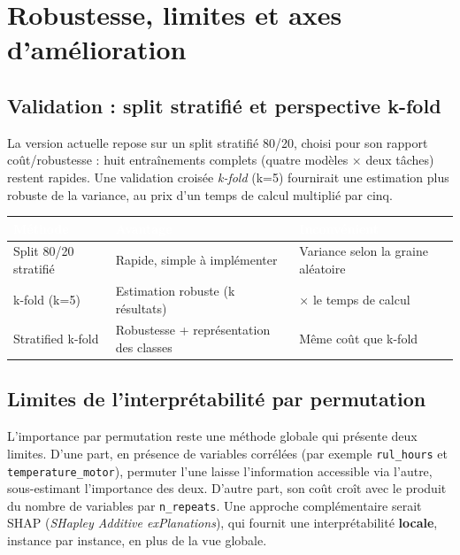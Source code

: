 \documentclass[11pt]{article}
\newcommand{\thead}[1]{\textbf{\textcolor{white}{#1}}}
\begin{document}
\section{Robustesse, limites et axes d'amélioration}
\label{sec:axes}

\subsection{Validation : split stratifié et perspective k-fold}

La version actuelle repose sur un split stratifié 80/20, choisi pour son rapport
coût/robustesse : huit entraînements complets (quatre modèles $\times$ deux tâches)
restent rapides. Une validation croisée \textit{k-fold} (k=5) fournirait une
estimation plus robuste de la variance, au prix d'un temps de calcul multiplié par
cinq.

\begin{center}
\begin{tabularx}{\linewidth}{|l|>{\raggedright\arraybackslash}X|>{\raggedright\arraybackslash}X|}
\hline
\rowcolor{tableHeader}
\thead{Méthode} & \thead{Avantage} & \thead{Inconvénient} \\
\hline
Split 80/20 stratifié & Rapide, simple à implémenter & Variance selon la graine aléatoire \\
\hline
k-fold (k=5) & Estimation robuste (k résultats) & 5$\times$ le temps de calcul \\
\hline
Stratified k-fold & Robustesse + représentation des classes & Même coût que k-fold \\
\hline
\end{tabularx}
\end{center}

\subsection{Limites de l'interprétabilité par permutation}

L'importance par permutation reste une méthode globale qui présente deux limites. D'une
part, en présence de variables corrélées (par exemple \texttt{rul\_hours} et
\texttt{temperature\_motor}), permuter l'une laisse l'information accessible via
l'autre, sous-estimant l'importance des deux. D'autre part, son coût croît avec le
produit du nombre de variables par \texttt{n\_repeats}. Une approche complémentaire
serait SHAP (\textit{SHapley Additive exPlanations}), qui fournit une interprétabilité
\textbf{locale}, instance par instance, en plus de la vue globale.
\end{document}
